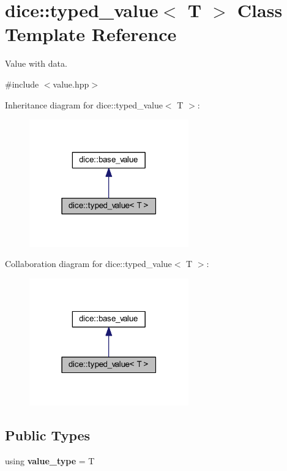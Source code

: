 \hypertarget{classdice_1_1typed__value}{}\section{dice\+:\+:typed\+\_\+value$<$ T $>$ Class Template Reference}
\label{classdice_1_1typed__value}


Value with data.  




{\ttfamily \#include $<$value.\+hpp$>$}



Inheritance diagram for dice\+:\+:typed\+\_\+value$<$ T $>$\+:\nopagebreak
\begin{figure}[H]
\begin{center}
\leavevmode
\includegraphics[width=195pt]{classdice_1_1typed__value__inherit__graph}
\end{center}
\end{figure}


Collaboration diagram for dice\+:\+:typed\+\_\+value$<$ T $>$\+:\nopagebreak
\begin{figure}[H]
\begin{center}
\leavevmode
\includegraphics[width=195pt]{classdice_1_1typed__value__coll__graph}
\end{center}
\end{figure}
\subsection*{Public Types}
\begin{DoxyCompactItemize}
\item 
\mbox{\label{classdice_1_1typed__value_a68dd4941f8e02bb9d4a7430530256887}} 
using {\bfseries value\+\_\+type} = T
\end{DoxyCompactItemize}

